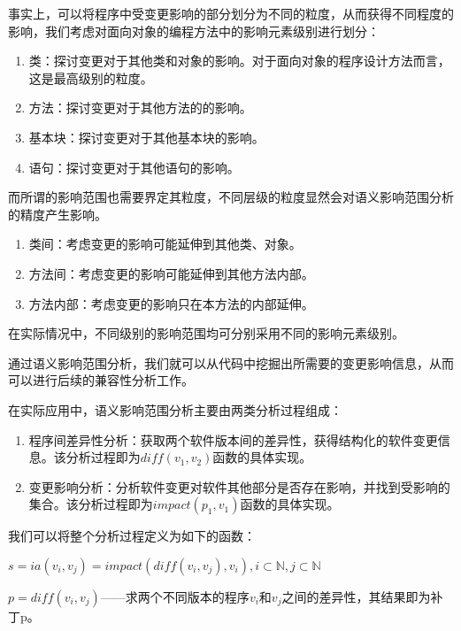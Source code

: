 事实上，可以将程序中受变更影响的部分划分为不同的粒度，从而获得不同程度的影响，我们考虑对面向对象的编程方法中的影响元素级别进行划分：

\begin{enumerate}
	\item 类：探讨变更对于其他类和对象的影响。对于面向对象的程序设计方法而言，这是最高级别的粒度。
	\item 方法：探讨变更对于其他方法的的影响。
	\item 基本块：探讨变更对于其他基本块的影响。
	\item 语句：探讨变更对于其他语句的影响。
\end{enumerate}

而所谓的影响范围也需要界定其粒度，不同层级的粒度显然会对语义影响范围分析的精度产生影响。

\begin{enumerate}
	\item 类间：考虑变更的影响可能延伸到其他类、对象。
	\item 方法间：考虑变更的影响可能延伸到其他方法内部。
	\item 方法内部：考虑变更的影响只在本方法的内部延伸。
\end{enumerate}

在实际情况中，不同级别的影响范围均可分别采用不同的影响元素级别。

通过语义影响范围分析，我们就可以从代码中挖掘出所需要的变更影响信息，从而可以进行后续的兼容性分析工作。

在实际应用中，语义影响范围分析主要由两类分析过程组成：
\begin{enumerate}
	\item 程序间差异性分析：获取两个软件版本间的差异性，获得结构化的软件变更信息。该分析过程即为$diff(v_1,v_2)$函数的具体实现。
	\item 变更影响分析：分析软件变更对软件其他部分是否存在影响，并找到受影响的集合。该分析过程即为$impact(p_1,v_1)$函数的具体实现。
\end{enumerate}


我们可以将整个分析过程定义为如下的函数：

\begin{definition}
	$s = ia(v_i,v_j) = impact(diff(v_i,v_j),v_i),i \subset \mathbb{N}, j \subset \mathbb{N}$
\end{definition}

\begin{definition}
	\label {define_diff}
	$p = diff(v_i,v_j)$——求两个不同版本的程序$v_i$和$v_j$之间的差异性，其结果即为补丁p。
\end{definition}

